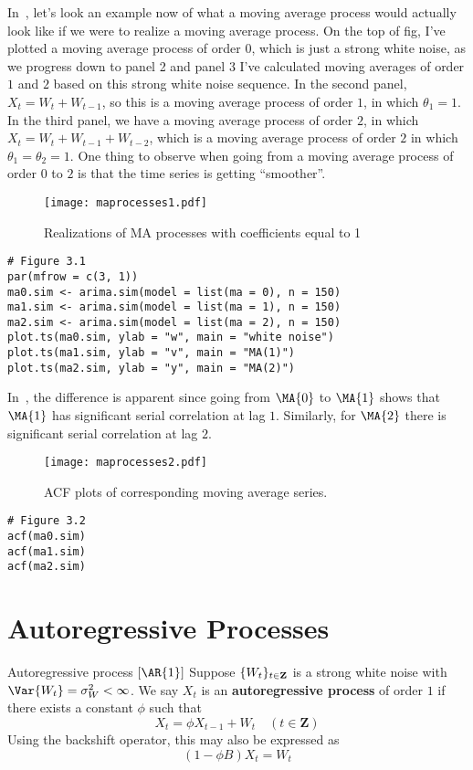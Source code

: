 {\color{blue}In~, let's look an example now of what a moving average process would
actually look like if we were to realize a moving average process.
On the top of fig, I've plotted a moving average process of order $ 0 $,
which is just a strong white noise, as we progress down to
panel 2 and panel 3 I've calculated moving averages of order $ 1 $ and
$ 2 $ based on this strong white noise sequence. In the second
panel, $ X_t=W_t+W_{t-1} $, so this is a moving average process
of order $ 1 $, in which $ \theta_1=1 $. In the third panel,
we have a moving average process of order $ 2 $,
in which $ X_t=W_t+W_{t-1}+W_{t-2} $, which is a
moving average process of order $ 2 $ in which
$ \theta_1=\theta_2=1 $. One thing to observe when going
from a moving average process of order $ 0 $ to $ 2 $
is that the time series is getting ``smoother''.}

\begin{figure}[!htbp]
    \centering
    \texttt{[image: maprocesses1.pdf]}
    \caption{Realizations of MA processes with coefficients equal to 1}\label{fig:maprocesses1}
\end{figure}
\begin{verbatim}
# Figure 3.1
par(mfrow = c(3, 1))
ma0.sim <- arima.sim(model = list(ma = 0), n = 150)
ma1.sim <- arima.sim(model = list(ma = 1), n = 150)
ma2.sim <- arima.sim(model = list(ma = 2), n = 150)
plot.ts(ma0.sim, ylab = "w", main = "white noise")
plot.ts(ma1.sim, ylab = "v", main = "MA(1)")
plot.ts(ma2.sim, ylab = "y", main = "MA(2)")
\end{verbatim}
In~, the difference is apparent since
going from $ \MA{0} $ to $ \MA{1} $ shows that
$ \MA{1} $ has significant serial correlation
at lag $ 1 $. Similarly, for $ \MA{2} $
there is significant serial correlation
at lag $ 2 $.
\begin{figure}[!htbp]
    \centering
    \texttt{[image: maprocesses2.pdf]}
    \caption{ACF plots of corresponding moving average series.}\label{fig:maprocesses2}
\end{figure}
\begin{verbatim}
# Figure 3.2
acf(ma0.sim)
acf(ma1.sim)
acf(ma2.sim)    
\end{verbatim}
\section{Autoregressive Processes}
\begin{Definition}{Autoregressive process $ [\AR{1}] $}{}
    Suppose $ \{W_t\}_{t\in\mathbf{Z}} $ is a strong
    white noise with $ \Var{W_t}=\sigma_W^2<\infty $. We say
    $ X_t $ is an \textbf{autoregressive process}
    of order $ 1 $ if there
    exists a constant $ \phi $ such that
    \[ X_t=\phi X_{t-1}+W_t\quad (t\in\mathbf{Z}) \]
    Using the backshift operator, this may also be expressed as
    \[ (1-\phi B)X_t=W_t \]
\end{Definition}
